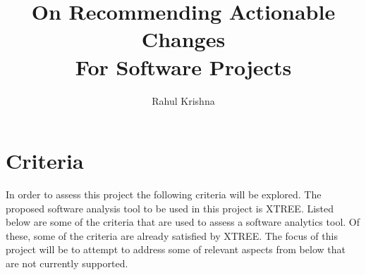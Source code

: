 \documentclass[sigconf, proceedings, 9pt]{acmart}
\begin{document}
\title{On Recommending Actionable Changes\\For Software Projects}
\author{Rahul Krishna}
\acmPrice{}

\maketitle

\section{Criteria}
In order to assess this project the following criteria will be explored. The 
proposed software analysis tool to be used in this project is XTREE. Listed 
below are some of the criteria that are used to assess a software analytics 
tool. Of these, some of the criteria are already satisfied by XTREE. The focus 
of this project will be to attempt to address some of relevant aspects from 
below that are not currently supported.
\end{document}
